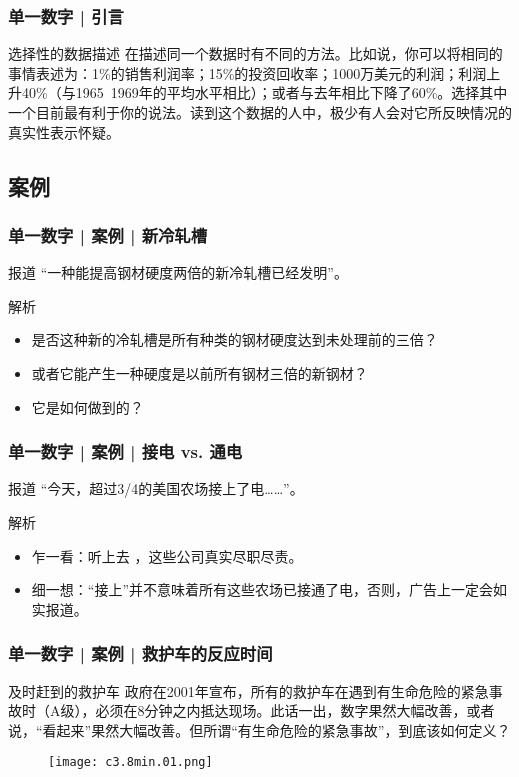 \begin{frame}
  \frametitle{单一数字 | 引言}
  \begin{block}{选择性的数据描述}
在描述同一个数据时有不同的方法。比如说，你可以将相同的事情表述为：1\%的销售利润率；15\%的投资回收率；1000万美元的利润；利润上升40\%（与1965~1969年的平均水平相比）；或者与去年相比下降了60\%。选择其中一个目前最有利于你的说法。读到这个数据的人中，极少有人会对它所反映情况的真实性表示怀疑。
  \end{block}
\end{frame}

\subsection{案例}
\begin{frame}
  \frametitle{单一数字 | 案例 | 新冷轧槽}
  \begin{block}{报道}
    “一种能提高钢材硬度两倍的新冷轧槽已经发明”。
  \end{block}
  \pause
  \begin{block}{解析}
    \begin{itemize}
      \item 是否这种新的冷轧槽是所有种类的钢材硬度达到未处理前的三倍？
      \item 或者它能产生一种硬度是以前所有钢材三倍的新钢材？
      \item 它是如何做到的？
    \end{itemize}
  \end{block}
\end{frame}

\begin{frame}
  \frametitle{单一数字 | 案例 | 接电 vs. 通电}
  \begin{block}{报道}
  “今天，超过3/4的美国农场接上了电……”。
  \end{block}
  \pause
  \begin{block}{解析}
    \begin{itemize}
      \item 乍一看：听上去 ，这些公司真实尽职尽责。
      \item 细一想：“接上”并不意味着所有这些农场已接通了电，否则，广告上一定会如实报道。
    \end{itemize}
  \end{block}
\end{frame}

\begin{frame}
  \frametitle{单一数字 | 案例 | 救护车的反应时间}
  \begin{block}{及时赶到的救护车}
政府在2001年宣布，所有的救护车在遇到有生命危险的紧急事故时（A级），必须在8分钟之内抵达现场。此话一出，数字果然大幅改善，或者说，“看起来”果然大幅改善。但所谓“有生命危险的紧急事故”，到底该如何定义？
  \end{block}
  \begin{figure}
    \centering
    \texttt{[image: c3.8min.01.png]}
  \end{figure}
\end{frame}

